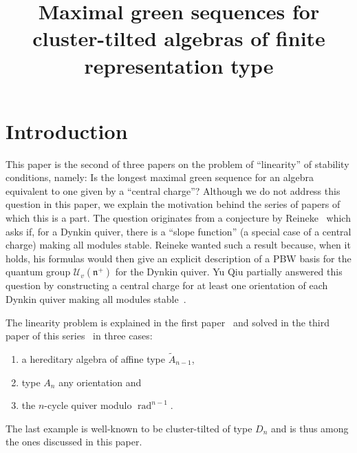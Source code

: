 \documentclass[ALCO,ThmDefs,Unicode,epreuves]{cedram}
\author{\firstname{Kiyoshi}  \lastname{Igusa}}
\title
[MGSs for cluster-tilted algebras of finite type]
{Maximal green sequences for cluster-tilted algebras of finite representation type}
\DeclareMathOperator{\rad}{rad}
\newcommand{\cU}{\ensuremath{{\mathcal{U}}}}
\begin{document}
\maketitle


\section{Introduction}


This paper is the second of three papers on the problem of ``linearity'' of stability conditions, namely: Is the longest maximal green sequence for an algebra equivalent to one given by a ``central charge''? Although we do not address this question in this paper, we explain the motivation behind the series of papers of which this is a part. The question originates from a conjecture by Reineke~\cite{Rein} which asks if, for a Dynkin quiver, there is a ``slope function'' (a special case of a central charge) making all modules stable. Reineke wanted such a result because, when it holds, his formulas would then give an explicit description of a PBW basis for the quantum group $\cU_v(\mathfrak n^+)$ for the Dynkin quiver. Yu Qiu partially answered this question by constructing a central charge for at least one orientation of each Dynkin quiver making all modules stable~\cite{Qiu}.


The linearity problem is explained in the first paper~\cite{PartI} and solved in the third paper of this series~\cite{AI} in three cases: 
\begin{enumerate}
\item\label{intro_1} a hereditary algebra of affine type $\tilde A_{n-1}$, 
\item\label{intro_2} type $A_n$ any orientation and 
\item\label{intro_3} the $n$-cycle quiver modulo $\rad ^{n-1}$. 
\end{enumerate}
The last example is well-known to be cluster-tilted of type $D_n$ and is thus among the ones discussed in this paper.
\end{document}
